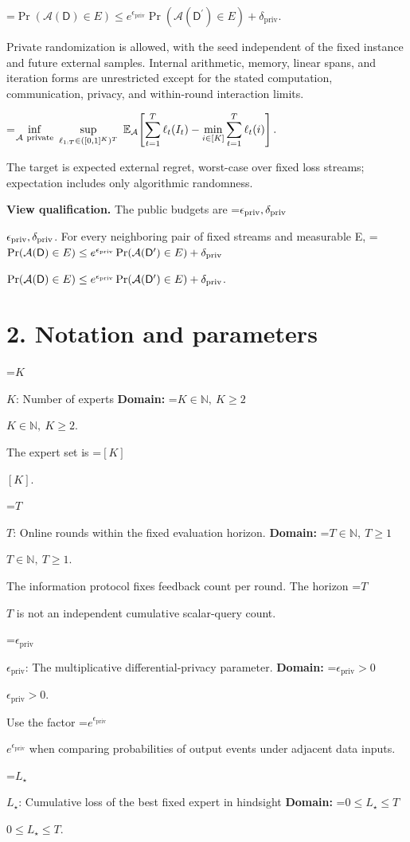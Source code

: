 \documentclass[10pt,a4paper]{article}
\newcommand{\AtlasMath}[1]{\par\begingroup\centering\setbox0=\hbox{$\displaystyle #1$}\ifdim\wd0>1.4\linewidth\typeout{ATLAS WIDE FORMULA: \the\wd0}\fi\ifdim\wd0>\linewidth\resizebox{\linewidth}{!}{\box0}\else\box0\fi\par\endgroup}
\newcommand{\AtlasInlineMath}[1]{\begingroup\setbox0=\hbox{$#1$}\ifdim\wd0>.4\linewidth\endgroup\AtlasMath{#1}\else\endgroup$#1$\fi}
\begin{document}
\AtlasMath{\Pr(\mathcal{A}(\mathsf D)\in E)\le e^{\epsilon_{\mathrm{priv}}}\Pr(\mathcal{A}(\mathsf D^{\prime})\in E)+\delta_{\mathrm{priv}}.}


Private randomization is allowed, with the seed independent of the fixed instance and future external samples. Internal arithmetic, memory, linear spans, and iteration forms are unrestricted except for the stated computation, communication, privacy, and within-round interaction limits.


\AtlasMath{\inf_{\mathcal{A}\ \text{\text{private}}}\ \sup_{\ell_{1:T}\in([0,1]^K)^T}\ \mathbb{E}_{\mathcal{A}}\!\left[\sum_{t=1}^{T}\ell_t(I_t)-\min_{i\in[K]}\sum_{t=1}^{T}\ell_t(i)\right].}


The target is expected external regret, worst-case over fixed loss streams; expectation includes only algorithmic randomness.

\textbf{View qualification.} The public budgets are \AtlasInlineMath{\epsilon_{\rm priv},\delta_{\rm priv}}. For every neighboring pair of fixed streams and measurable E, \AtlasInlineMath{\Pr(\mathcal A(\mathsf D)\in E)\le e^{\epsilon_{\rm priv}}\Pr(\mathcal A(\mathsf D^{\prime})\in E)+\delta_{\rm priv}}.

\section{2. Notation and parameters}
\AtlasInlineMath{K}: Number of experts \textbf{Domain:} \AtlasInlineMath{K\in\mathbb N,\ K\ge2}.

The expert set is \AtlasInlineMath{[K]}.

\AtlasInlineMath{T}: Online rounds within the fixed evaluation horizon. \textbf{Domain:} \AtlasInlineMath{T\in\mathbb N,\ T\ge1}.

The information protocol fixes feedback count per round. The horizon \AtlasInlineMath{T} is not an independent cumulative scalar-query count.

\AtlasInlineMath{\epsilon_{\mathrm{priv}}}: The multiplicative differential-privacy parameter. \textbf{Domain:} \AtlasInlineMath{\epsilon_{\mathrm{priv}}>0}.

Use the factor \AtlasInlineMath{e^{\epsilon_{\mathrm{priv}}}} when comparing probabilities of output events under adjacent data inputs.

\AtlasInlineMath{L_\star}: Cumulative loss of the best fixed expert in hindsight \textbf{Domain:} \AtlasInlineMath{0\le L_\star\le T}.
\end{document}
